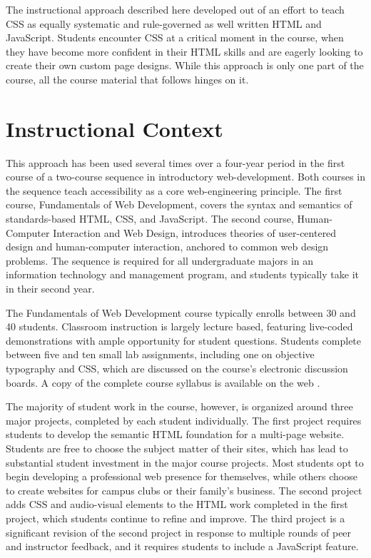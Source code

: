 \documentclass[sigplan,screen]{acmart}
\begin{document}
The instructional approach described here developed out of an effort to teach CSS as equally systematic and rule-governed as well written HTML and JavaScript. Students encounter CSS at a critical moment in the course, when they have become more confident in their HTML skills and are eagerly looking to create their own custom page designs. While this approach is only one part of the course, all the course material that follows hinges on it.

\section{Instructional Context}

This approach has been used several times over a four-year period in the first course of a two-course sequence in introductory web-development. Both courses in the sequence teach accessibility as a core web-engineering principle. The first course, Fundamentals of Web Development, covers the syntax and semantics of standards-based HTML, CSS, and JavaScript. The second course, Human-Computer Interaction and Web Design, introduces theories of user-centered design and human-computer interaction, anchored to common web design problems. The sequence is required for all undergraduate majors in an information technology and management program, and students typically take it in their second year.

The Fundamentals of Web Development course typically enrolls between 30 and 40 students. Classroom instruction is largely lecture based, featuring live-coded demonstrations with ample opportunity for student questions. Students complete between five and ten small lab assignments, including one on objective typography and CSS, which are discussed on the course's electronic discussion boards. A copy of the complete course syllabus is available on the web \cite{kas:fwd}.

The majority of student work in the course, however, is organized around three major projects, completed by each student individually. The first project requires students to develop the semantic HTML foundation for a multi-page website. Students are free to choose the subject matter of their sites, which has lead to substantial student investment in the major course projects. Most students opt to begin developing a professional web presence for themselves, while others choose to create websites for campus clubs or their family's business. The second project adds CSS and audio-visual elements to the HTML work completed in the first project, which students continue to refine and improve. The third project is a significant revision of the second project in response to multiple rounds of peer and instructor feedback, and it requires students to include a JavaScript feature.
\end{document}
